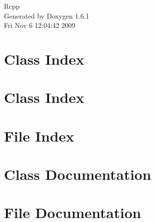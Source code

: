 \documentclass[a4paper]{book}
\begin{document}
\hypersetup{pageanchor=false}
\begin{titlepage}
\vspace*{7cm}
\begin{center}
{\Large Rcpp }\\
\vspace*{1cm}
{\large Generated by Doxygen 1.6.1}\\
\vspace*{0.5cm}
{\small Fri Nov 6 12:04:42 2009}\\
\end{center}
\end{titlepage}
\clearemptydoublepage
{}
\tableofcontents
\clearemptydoublepage
{}
\hypersetup{pageanchor=true}
\chapter{Class Index}

\chapter{Class Index}

\chapter{File Index}

\chapter{Class Documentation}



















\chapter{File Documentation}





\printindex
\end{document}
